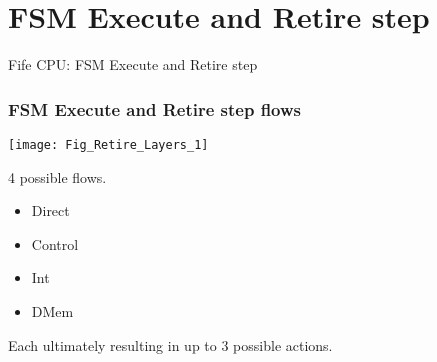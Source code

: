 
\section{FSM Execute and Retire step}

\begin{frame}[fragile]

\begin{center}
  {\LARGE Fife CPU: FSM Execute and Retire step}
\end{center}

\end{frame}


\begin{frame}[fragile]
\frametitle{FSM Execute and Retire step flows}

\begin{minipage}{0.75\textwidth}
 \texttt{[image: Fig\_Retire\_Layers\_1]}
\end{minipage}
\hm
\begin{minipage}{0.2\textwidth}
4 possible flows.
\begin{itemize}
 \item Direct
 \item Control
 \item Int
 \item DMem
\end{itemize}

\vspace{2ex}

Each ultimately resulting in up to 3 possible actions.
\end{minipage}

\end{frame}


